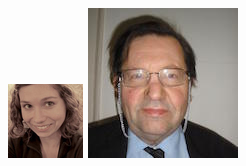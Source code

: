 \documentclass{beamer}
\begin{document}
\begin{frame}
\begin{columns}
        \begin{column}{.2\textwidth}
            \begin{center}
                \includegraphics[width=.8\textwidth]{img/fellows/iza_romanowska_thumb.jpg}
                \vspace{.2cm}
                \includegraphics[width=.8\textwidth]{img/fellows/james-harold-davenport_thumb.jpg}
                \vspace{.2cm}

\end{center}
\end{column}
\end{columns}
\end{frame}
\end{document}
